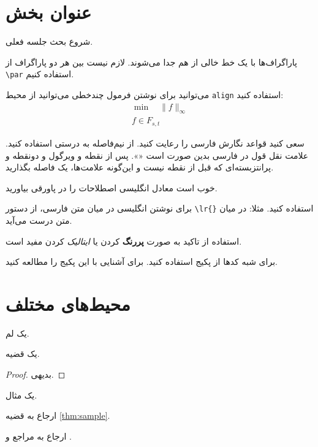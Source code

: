 
\newpage
\section{عنوان بخش}
شروع بحث جلسه فعلی. 

پاراگراف‌ها با یک خط خالی از هم جدا می‌شوند. لازم نیست بین هر دو پاراگراف از \verb|\par|  استفاده کنیم.

می‌توانید برای نوشتن فرمول چندخطی می‌توانید از محیط \verb|align| استفاده کنید:
\begin{align*} 
\min \quad \| f \|_{\infty}\\ 
f \in F_{s,t} 
\end{align*}

سعی کنید قواعد نگارش فارسی را رعایت کنید. از نیم‌فاصله
به درستی استفاده کنید. علامت نقل قول در فارسی بدین صورت است «». پس از نقطه و ویرگول و دونقطه و پرانتزبسته‌ای که قبل از نقطه نیست و این‌گونه علامت‌ها، یک فاصله بگذارید.

خوب است معادل انگلیسی اصطلاحات را در پاورقی%
بیاورید.

برای نوشتن انگلیسی در میان متن فارسی، از دستور \verb+\lr{}+ استفاده کنید. 
مثلا:
در میان متن درست می‌آید.

استفاده از تاکید به صورت 
\textbf{پررنگ}
کردن یا 
\textit{ایتالیک}
کردن مفید است. 

برای شبه کدها از پکیج
استفاده کنید. برای آشنایی با این پکیج
را مطالعه کنید.


\section{محیط‌های مختلف}
\begin{lemma}
	یک لم.
\end{lemma}
\begin{theorem}
	\label{thm:sample}
	یک قضیه. 
\end{theorem}
\begin{proof}
	بدیهی.
\end{proof}

\begin{example}
	یک مثال. 
\end{example}

ارجاع به قضیه 
\ref{thm:sample}.

ارجاع به مراجع
\cite{lecture1}
و
\cite{CLRS}.


